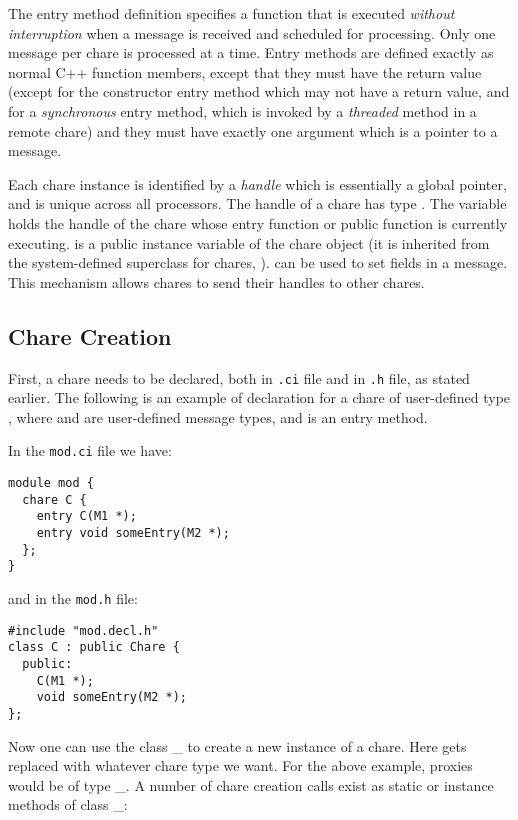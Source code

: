 The entry method definition specifies a function that is executed {\it
without interruption} when a message is received and scheduled for
processing. Only one message per chare is processed at a time.  Entry
methods are defined exactly as normal C++ function members, except
that they must have the return value  (except for the
constructor entry method which may not have a return value, and for a {\em synchronous}
entry method, which is invoked by a {\em threaded} method in a remote chare) and they
must have exactly one argument which is a pointer to a
message.

Each chare instance is identified by a {\it handle} 
which is essentially a global pointer, and is unique across all
processors.  The handle of a chare has type .  The
variable  holds the handle of the
chare whose entry function or public function is currently executing.
 is a public instance variable of the chare object
(it is inherited from the system-defined superclass for chares, ).
 can be used to set fields in a message. This  
mechanism allows chares to send their handles to other chares.

\subsection{Chare Creation}
\label{chare creation}

First, a chare needs to be declared, both in {\tt .ci} file and in
{\tt .h} file, as stated earlier. The following is an example of
declaration for a chare of user-defined type , where 
and  are user-defined message types, and 
is an entry method.

In the {\tt mod.ci} file we have:

\begin{verbatim}
module mod {
  chare C {
    entry C(M1 *);
    entry void someEntry(M2 *);
  };
}
\end{verbatim}

and in the {\tt mod.h} file:

\begin{verbatim}
#include "mod.decl.h"
class C : public Chare {
  public:
    C(M1 *);
    void someEntry(M2 *);
};
\end{verbatim}

Now one can use the class \_ to create
a new instance of a chare.  Here  gets replaced with
whatever chare type we want.  For the above example, proxies would
be of type \_. A number of chare creation calls
exist as static or instance methods of class \_:

